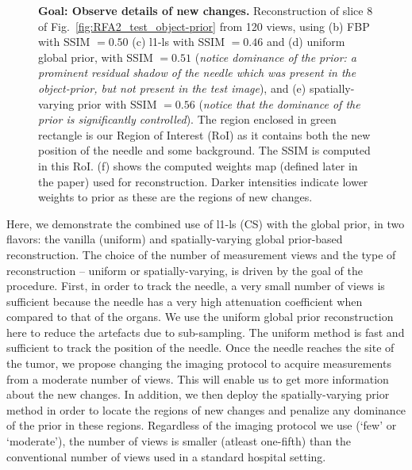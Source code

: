 \documentclass[journal]{IEEEtran}
\begin{document}
\begin{figure}[!h]
\caption[Representative results-2]{\textbf{Goal: Observe details of new changes.} Reconstruction of slice 8 of Fig.~\ref{fig:RFA2_test_object-prior} from 120 views, using (b) FBP with SSIM $= 0.50$ (c) l1-ls with SSIM $=0.46$ and (d) uniform global prior, with SSIM $=0.51$ (\emph{notice dominance of the prior: a prominent residual shadow of the needle which was present in the object-prior, but not present in the test image}), and (e) spatially-varying prior with SSIM $=0.56$ (\emph{notice that the dominance of the prior is significantly controlled}). The region enclosed in green rectangle is our Region of Interest (RoI) as it contains both the new position of the needle and some background. The SSIM is computed in this RoI. (f) shows the computed weights map (defined later in the paper) used for reconstruction. Darker intensities indicate lower weights to prior as these are the regions of new changes.}
\label{fig:RFA2_few_views}
\end{figure}

Here, we demonstrate the combined use of l1-ls (CS) with the global
prior, in two flavors: the vanilla (uniform) and spatially-varying
global prior-based reconstruction. The choice of the number of
measurement views and the type of reconstruction -- uniform or
spatially-varying, is driven by the goal of the procedure. First, in
order to track the needle, a very small number of views is sufficient
because the needle has a very high attenuation coefficient when
compared to that of the organs. We use the uniform global prior
reconstruction here to reduce the artefacts due to sub-sampling. The
uniform method is fast and sufficient to track the position of the
needle.  Once the needle reaches the site of the tumor, we propose
changing the imaging protocol to acquire measurements from a moderate
number of views. This will enable us to get more information about the
new changes. In addition, we then deploy the spatially-varying prior
method in order to locate the regions of new changes and penalize any
dominance of the prior in these regions.  Regardless of the imaging
protocol we use (`few' or `moderate'), the number of views is smaller
(atleast one-fifth) than the conventional number of views used in a
standard hospital setting.
\end{document}
